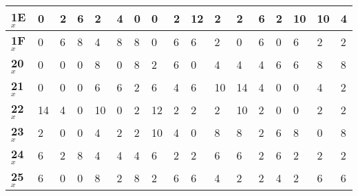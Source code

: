 \begin{longtable}[c]{|l|l|l|l|l|l|l|l|l|l|l|l|l|l|l|l|l|}
\textbf{1E$_x$} & 0              & 2              & 6              & 2              & 4              & 0              & 0              & 2              & 12             & 2              & 2              & 6              & 2              & 10             & 10             & 4              \\ \hline
\textbf{1F$_x$} & 0              & 6              & 8              & 4              & 8              & 8              & 0              & 6              & 6              & 2              & 0              & 6              & 0              & 6              & 2              & 2              \\ \hline
\textbf{20$_x$} & 0              & 0              & 0              & 8              & 0              & 8              & 2              & 6              & 0              & 4              & 4              & 4              & 6              & 6              & 8              & 8              \\ \hline
\textbf{21$_x$} & 0              & 0              & 0              & 6              & 6              & 2              & 6              & 4              & 6              & 10             & 14             & 4              & 0              & 0              & 4              & 2              \\ \hline
\textbf{22$_x$} & 14             & 4              & 0              & 10             & 0              & 2              & 12             & 2              & 2              & 2              & 10             & 2              & 0              & 0              & 2              & 2              \\ \hline
\textbf{23$_x$} & 2              & 0              & 0              & 4              & 2              & 2              & 10             & 4              & 0              & 8              & 8              & 2              & 6              & 8              & 0              & 8              \\ \hline
\textbf{24$_x$} & 6              & 2              & 8              & 4              & 4              & 4              & 6              & 2              & 2              & 6              & 6              & 2              & 6              & 2              & 2              & 2              \\ \hline
\textbf{25$_x$} & 6              & 0              & 0              & 8              & 2              & 8              & 2              & 6              & 6              & 4              & 2              & 2              & 4              & 2              & 6              & 6              \\ \hline

\end{longtable}
